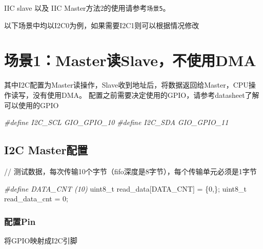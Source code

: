 \documentclass[
  12pt,
]{book}
\newenvironment{Shaded}{\begin{snugshade}}{\end{snugshade}}
\newcommand{\DataTypeTok}[1]{\textcolor[rgb]{0.13,0.29,0.53}{#1}}
\newcommand{\DecValTok}[1]{\textcolor[rgb]{0.00,0.00,0.81}{#1}}
\newcommand{\NormalTok}[1]{#1}
\newcommand{\PreprocessorTok}[1]{\textcolor[rgb]{0.56,0.35,0.01}{\textit{#1}}}
\begin{document}
IIC slave 以及 IIC Master方法2的使用请参考\texttt{场景5}。

以下场景中均以I2C0为例，如果需要I2C1则可以根据情况修改

\hypertarget{ux573aux666f1masterux8bfbslaveux4e0dux4f7fux7528dma}{%
\section{场景1：Master读Slave，不使用DMA}\label{ux573aux666f1masterux8bfbslaveux4e0dux4f7fux7528dma}}

其中I2C配置为Master读操作，Slave收到地址后，将数据返回给Master，CPU操作读写，没有使用DMA。 配置之前需要决定使用的GPIO，请参考datasheet了解可以使用的GPIO

\begin{Shaded}
\begin{Highlighting}[]
\PreprocessorTok{#define I2C_SCL         GIO_GPIO_10}
\PreprocessorTok{#define I2C_SDA         GIO_GPIO_11}
\end{Highlighting}
\end{Shaded}

\hypertarget{i2c-masterux914dux7f6e}{%
\subsection{I2C Master配置}\label{i2c-masterux914dux7f6e}}

// 测试数据，每次传输10个字节（fifo深度是8字节），每个传输单元必须是1字节

\begin{Shaded}
\begin{Highlighting}[]
\PreprocessorTok{#define DATA_CNT (10)}
\DataTypeTok{uint8_t}\NormalTok{ read_data[DATA_CNT] = \{}\DecValTok{0}\NormalTok{,\};}
\DataTypeTok{uint8_t}\NormalTok{ read_data_cnt = }\DecValTok{0}\NormalTok{;}
\end{Highlighting}
\end{Shaded}

\hypertarget{ux914dux7f6epin}{%
\subsubsection{配置Pin}\label{ux914dux7f6epin}}

将GPIO映射成I2C引脚
\end{document}
